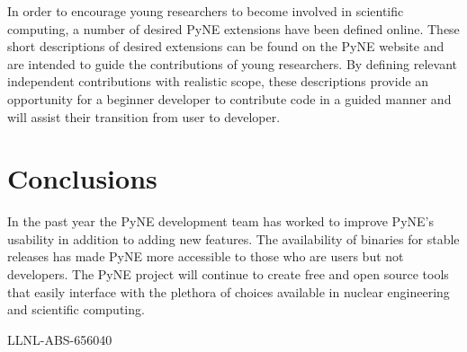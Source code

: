 \documentclass{anstrans}
\begin{document}
In order to encourage young researchers to become involved in scientific 
computing, a number of desired PyNE extensions have been defined online. These 
short descriptions of desired extensions can be found on the PyNE website and 
are intended to guide the contributions of young researchers. By defining 
relevant independent contributions with realistic scope, these descriptions 
provide an opportunity for a beginner developer to contribute code in a guided 
manner and will assist their transition from user to developer.

\section{Conclusions}

In the past year the PyNE development team has worked to improve PyNE's 
usability in addition to adding new features. The availability of binaries 
for stable releases has made PyNE more accessible to those who are users 
but not developers. The PyNE project will continue to create free and open 
source tools that easily interface with the plethora of choices available in 
nuclear engineering and scientific computing. 

\vspace{0.1in}
\noindent LLNL-ABS-656040
 
 
\end{document}
